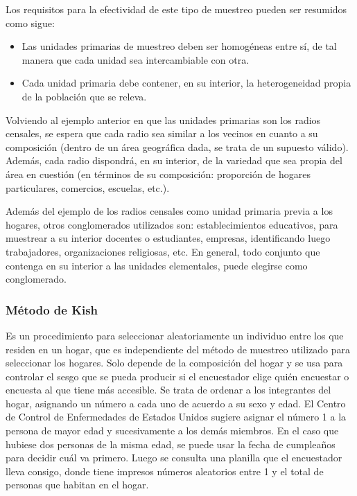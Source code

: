 \documentclass[]{article}
\begin{document}
Los requisitos para la efectividad de este tipo de muestreo pueden ser
resumidos como sigue:

\begin{itemize}
\item
  Las unidades primarias de muestreo deben ser homogéneas entre sí, de
  tal manera que cada unidad sea intercambiable con otra.
\item
  Cada unidad primaria debe contener, en su interior, la heterogeneidad propia de la población que se releva.
\end{itemize}

Volviendo al ejemplo anterior en que las unidades primarias son los radios censales, se espera que cada radio sea similar a los vecinos en cuanto a su composición (dentro de un área geográfica dada, se trata de un supuesto válido). Además, cada radio dispondrá, en su interior, de la
variedad que sea propia del área en cuestión (en términos de su
composición: proporción de hogares particulares, comercios, escuelas, etc.).

Además del ejemplo de los radios censales como unidad primaria previa a los hogares, otros conglomerados utilizados son: establecimientos educativos, para muestrear a su interior docentes o estudiantes, empresas, identificando luego trabajadores, organizaciones religiosas, etc. En general, todo conjunto que contenga en su interior a las unidades elementales, puede elegirse como conglomerado.

\hypertarget{metodo-de-kish}{%
\subsubsection{Método de Kish}\label{metodo-de-kish}}

Es un procedimiento para seleccionar aleatoriamente un individuo entre los que residen en un hogar, que es independiente del método de muestreo utilizado para seleccionar los hogares. Solo depende de la composición del hogar y se usa para controlar el sesgo que se pueda producir si el encuestador elige quién encuestar o encuesta al que tiene más accesible.
Se trata de ordenar a los integrantes del hogar, asignando un número a cada uno de acuerdo a su sexo y edad. El Centro de Control de Enfermedades de Estados Unidos sugiere asignar el número 1 a la persona de mayor edad y sucesivamente a los demás miembros. En el caso que hubiese dos personas de la misma edad, se puede usar la fecha de cumpleaños para decidir cuál va primero. Luego se consulta una planilla que el encuestador lleva consigo, donde tiene impresos números aleatorios entre 1 y el total de personas que habitan en el hogar.
\end{document}
